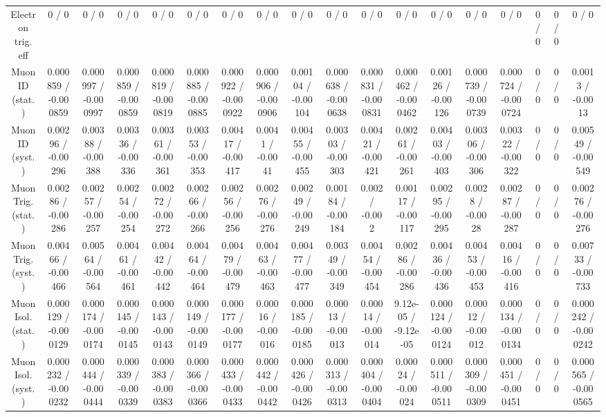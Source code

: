 \documentclass[10pt]{article}
\begin{document}
\begin{table}[htbp]
\begin{center}
\begin{tabular}{|c|c|c|c|c|c|c|c|c|c|c|c|c|c|c|c|c|c|}
  Electron trig. eff & 0 / 0 & 0 / 0 & 0 / 0 & 0 / 0 & 0 / 0 & 0 / 0 & 0 / 0 & 0 / 0 & 0 / 0 & 0 / 0 & 0 / 0 & 0 / 0 & 0 / 0 & 0 / 0 & 0 / 0 & 0 / 0 & 0 / 0 \\ 
  Muon ID (stat.) & 0.000859 / -0.000859 & 0.000997 / -0.000997 & 0.000859 / -0.000859 & 0.000819 / -0.000819 & 0.000885 / -0.000885 & 0.000922 / -0.000922 & 0.000906 / -0.000906 & 0.00104 / -0.00104 & 0.000638 / -0.000638 & 0.000831 / -0.000831 & 0.000462 / -0.000462 & 0.00126 / -0.00126 & 0.000739 / -0.000739 & 0.000724 / -0.000724 & 0 / 0 & 0 / 0 & 0.0013 / -0.0013 \\ 
  Muon ID (syst.) & 0.00296 / -0.00296 & 0.00388 / -0.00388 & 0.00336 / -0.00336 & 0.00361 / -0.00361 & 0.00353 / -0.00353 & 0.00417 / -0.00417 & 0.0041 / -0.0041 & 0.00455 / -0.00455 & 0.00303 / -0.00303 & 0.00421 / -0.00421 & 0.00261 / -0.00261 & 0.00403 / -0.00403 & 0.00306 / -0.00306 & 0.00322 / -0.00322 & 0 / 0 & 0 / 0 & 0.00549 / -0.00549 \\ 
  Muon Trig. (stat.) & 0.00286 / -0.00286 & 0.00257 / -0.00257 & 0.00254 / -0.00254 & 0.00272 / -0.00272 & 0.00266 / -0.00266 & 0.00256 / -0.00256 & 0.00276 / -0.00276 & 0.00249 / -0.00249 & 0.00184 / -0.00184 & 0.002 / -0.002 & 0.00117 / -0.00117 & 0.00295 / -0.00295 & 0.0028 / -0.0028 & 0.00287 / -0.00287 & 0 / 0 & 0 / 0 & 0.00276 / -0.00276 \\ 
  Muon Trig. (syst.) & 0.00466 / -0.00466 & 0.00564 / -0.00564 & 0.00461 / -0.00461 & 0.00442 / -0.00442 & 0.00464 / -0.00464 & 0.00479 / -0.00479 & 0.00463 / -0.00463 & 0.00477 / -0.00477 & 0.00349 / -0.00349 & 0.00454 / -0.00454 & 0.00286 / -0.00286 & 0.00436 / -0.00436 & 0.00453 / -0.00453 & 0.00416 / -0.00416 & 0 / 0 & 0 / 0 & 0.00733 / -0.00733 \\ 
  Muon Isol. (stat.) & 0.000129 / -0.000129 & 0.000174 / -0.000174 & 0.000145 / -0.000145 & 0.000143 / -0.000143 & 0.000149 / -0.000149 & 0.000177 / -0.000177 & 0.00016 / -0.00016 & 0.000185 / -0.000185 & 0.00013 / -0.00013 & 0.00014 / -0.00014 & 9.12e-05 / -9.12e-05 & 0.000124 / -0.000124 & 0.00012 / -0.00012 & 0.000134 / -0.000134 & 0 / 0 & 0 / 0 & 0.000242 / -0.000242 \\ 
  Muon Isol. (syst.) & 0.000232 / -0.000232 & 0.000444 / -0.000444 & 0.000339 / -0.000339 & 0.000383 / -0.000383 & 0.000366 / -0.000366 & 0.000433 / -0.000433 & 0.000442 / -0.000442 & 0.000426 / -0.000426 & 0.000313 / -0.000313 & 0.000404 / -0.000404 & 0.00024 / -0.00024 & 0.000511 / -0.000511 & 0.000309 / -0.000309 & 0.000451 / -0.000451 & 0 / 0 & 0 / 0 & 0.000565 / -0.000565 \\ 

\end{tabular}
\end{center}
\end{table}
\end{document}

